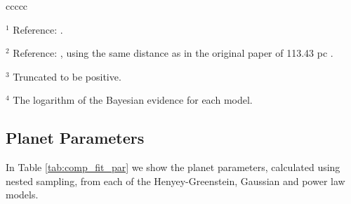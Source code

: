 \documentclass[11pt,twocolumn,twocolappendix]{aastex631}
\begin{document}
\begin{deluxetable*}{ccccc}
{     $^1$ Reference: \cite{kep2}.
     
     $^2$ Reference: \cite{kep1}, using the same distance as in the original paper of 113.43 pc \citep{gai18}.
     
     $^3$ Truncated to be positive.
     
     $^4$ The logarithm of the Bayesian evidence for each model.}
     
\end{deluxetable*}

\subsection{Planet Parameters}

In Table \ref{tab:comp_fit_par} we show the planet parameters, calculated using nested sampling, from each of the Henyey-Greenstein, Gaussian and power law models. %



\end{document}
